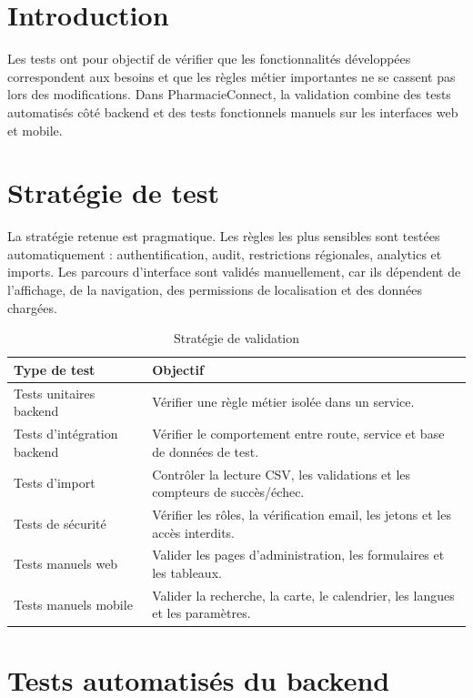 \section{Introduction}

Les tests ont pour objectif de vérifier que les fonctionnalités développées correspondent aux besoins et
que les règles métier importantes ne se cassent pas lors des modifications. Dans PharmacieConnect, la
validation combine des tests automatisés côté backend et des tests fonctionnels manuels sur les
interfaces web et mobile.

\section{Stratégie de test}

La stratégie retenue est pragmatique. Les règles les plus sensibles sont testées automatiquement :
authentification, audit, restrictions régionales, analytics et imports. Les parcours d'interface sont
validés manuellement, car ils dépendent de l'affichage, de la navigation, des permissions de localisation
et des données chargées.

\begin{table}[H]
    \centering
    \begin{tabular}{L{4cm}L{9cm}}
        \toprule
        \textbf{Type de test} & \textbf{Objectif} \\
        \midrule
        Tests unitaires backend & Vérifier une règle métier isolée dans un service. \\
        Tests d'intégration backend & Vérifier le comportement entre route, service et base de données de test. \\
        Tests d'import & Contrôler la lecture CSV, les validations et les compteurs de succès/échec. \\
        Tests de sécurité & Vérifier les rôles, la vérification email, les jetons et les accès interdits. \\
        Tests manuels web & Valider les pages d'administration, les formulaires et les tableaux. \\
        Tests manuels mobile & Valider la recherche, la carte, le calendrier, les langues et les paramètres. \\
        \bottomrule
    \end{tabular}
    \caption{Stratégie de validation}
\end{table}

\section{Tests automatisés du backend}


